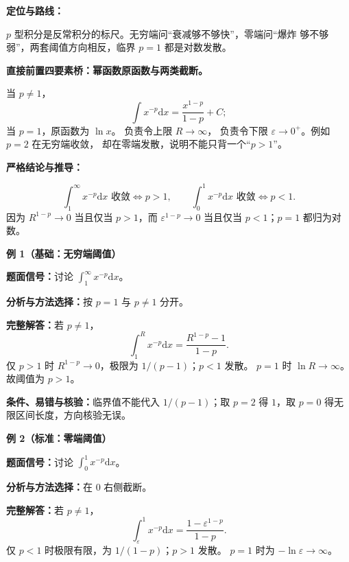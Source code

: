 
\par

\begin{knowledgeBox}
\textbf{定位与路线：}

\(p\) 型积分是反常积分的标尺。无穷端问“衰减够不够快”，零端问“爆炸
够不够弱”，两套阈值方向相反，临界 \(p=1\) 都是对数发散。

\textbf{直接前置四要素桥：幂函数原函数与两类截断。}

当 \(p\ne1\)，
\[
\int x^{-p}\mathrm dx=\frac{x^{1-p}}{1-p}+C;
\]
当 \(p=1\)，原函数为 \(\ln x\)。
负责令上限
\(R\to\infty\)，
负责令下限
\(\varepsilon\to0^+\)。例如 \(p=2\) 在无穷端收敛，
却在零端发散，说明不能只背一个“\(p>1\)”。

\textbf{严格结论与推导：}

\[
\boxed{\int_1^\infty x^{-p}\mathrm dx\text{ 收敛}\iff p>1,}
\qquad
\boxed{\int_0^1 x^{-p}\mathrm dx\text{ 收敛}\iff p<1.}
\]
因为 \(R^{1-p}\to0\) 当且仅当 \(p>1\)，而
\(\varepsilon^{1-p}\to0\) 当且仅当 \(p<1\)；\(p=1\) 都归为对数。

\textbf{例 1（基础：无穷端阈值）}

\textbf{题面信号：}讨论 \(\int_1^\infty x^{-p}\mathrm dx\)。

\textbf{分析与方法选择：}按 \(p=1\) 与 \(p\ne1\) 分开。

\textbf{完整解答：}若 \(p\ne1\)，
\[
\int_1^R x^{-p}\mathrm dx
=\frac{R^{1-p}-1}{1-p}.
\]
仅 \(p>1\) 时 \(R^{1-p}\to0\)，极限为 \(1/(p-1)\)；\(p<1\) 发散。
\(p=1\) 时 \(\ln R\to\infty\)。故阈值为 \(p>1\)。

\textbf{条件、易错与核验：}临界值不能代入 \(1/(p-1)\)；取
\(p=2\) 得 \(1\)，取 \(p=0\) 得无限区间长度，方向核验无误。

\textbf{例 2（标准：零端阈值）}

\textbf{题面信号：}讨论 \(\int_0^1x^{-p}\mathrm dx\)。

\textbf{分析与方法选择：}在 \(0\) 右侧截断。

\textbf{完整解答：}若 \(p\ne1\)，
\[
\int_\varepsilon^1x^{-p}\mathrm dx
=\frac{1-\varepsilon^{1-p}}{1-p}.
\]
仅 \(p<1\) 时极限有限，为 \(1/(1-p)\)；\(p>1\) 发散。
\(p=1\) 时为 \(-\ln\varepsilon\to\infty\)。


\end{knowledgeBox}
